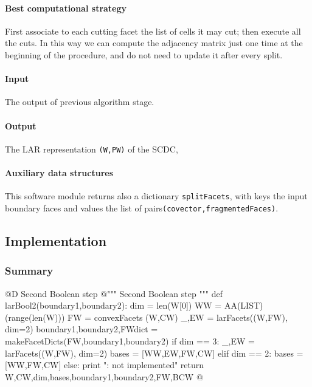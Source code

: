 \documentclass[11pt,oneside]{article}	%
\begin{document}
\paragraph{Best computational strategy}
First associate to each cutting facet the list of cells it may cut; then execute all the cuts. In this way we can compute the adjacency matrix just one time at the beginning of the procedure, and do not need to update it after every split.

\paragraph{Input}
The output of previous algorithm stage.

\paragraph{Output}
The LAR representation \texttt{(W,PW)} of the SCDC,

\paragraph{Auxiliary data structures} 
This software module returns also
 a dictionary \texttt{splitFacets}, with keys the  input boundary faces and values the list of pairs\texttt{(covector,fragmentedFaces)}.   


\subsection{Implementation}

\subsubsection{Summary}

@D Second Boolean step
@{""" Second Boolean step """
def larBool2(boundary1,boundary2):
	dim = len(W[0])
	WW = AA(LIST)(range(len(W)))
	FW = convexFacets (W,CW)
	_,EW = larFacets((W,FW), dim=2)
	boundary1,boundary2,FWdict = makeFacetDicts(FW,boundary1,boundary2)
	if dim == 3: 
		_,EW = larFacets((W,FW), dim=2)
		bases = [WW,EW,FW,CW]
	elif dim == 2: bases = [WW,FW,CW]
	else: print "\nerror: not implemented\n"
	return W,CW,dim,bases,boundary1,boundary2,FW,BCW
@}
\end{document}
